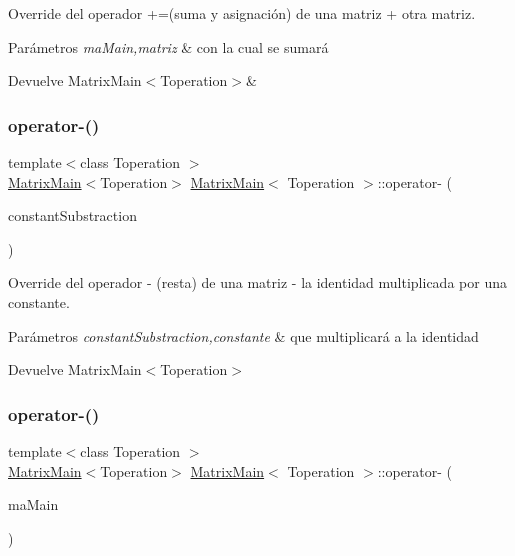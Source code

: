Override del operador +=(suma y asignación) de una matriz + otra matriz. 


\begin{DoxyParams}{Parámetros}
{\em ma\+Main,matriz} & con la cual se sumará \\
\hline
\end{DoxyParams}
\begin{DoxyReturn}{Devuelve}
Matrix\+Main$<$\+Toperation$>$\& 
\end{DoxyReturn}
\mbox{\label{classMatrixMain_a9105969d693cab31a797b1f5c7e63d69}} 
\subsubsection{\texorpdfstring{operator-\/()}{operator-()}\hspace{0.1cm}{\footnotesize\ttfamily [1/3]}}
{\footnotesize\ttfamily template$<$class Toperation $>$ \\
\hyperlink{classMatrixMain}{Matrix\+Main}$<$Toperation$>$ \hyperlink{classMatrixMain}{Matrix\+Main}$<$ Toperation $>$\+::operator-\/ (\begin{DoxyParamCaption}\item[{const Toperation \&}]{constant\+Substraction }\end{DoxyParamCaption})}



Override del operador -\/ (resta) de una matriz -\/ la identidad multiplicada por una constante. 


\begin{DoxyParams}{Parámetros}
{\em constant\+Substraction,constante} & que multiplicará a la identidad \\
\hline
\end{DoxyParams}
\begin{DoxyReturn}{Devuelve}
Matrix\+Main$<$\+Toperation$>$ 
\end{DoxyReturn}
\mbox{\label{classMatrixMain_ac3ec4e4edf0d77e97cd8b4c8ecfc32ee}} 
\subsubsection{\texorpdfstring{operator-\/()}{operator-()}\hspace{0.1cm}{\footnotesize\ttfamily [2/3]}}
{\footnotesize\ttfamily template$<$class Toperation $>$ \\
\hyperlink{classMatrixMain}{Matrix\+Main}$<$Toperation$>$ \hyperlink{classMatrixMain}{Matrix\+Main}$<$ Toperation $>$\+::operator-\/ (\begin{DoxyParamCaption}\item[{\hyperlink{classMatrixMain}{Matrix\+Main}$<$ Toperation $>$ \&}]{ma\+Main }\end{DoxyParamCaption})}



